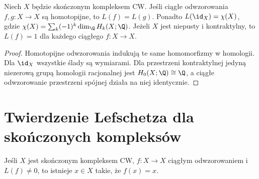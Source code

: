 \begin{wniosek}
Niech $X$ będzie skończonym kompleksem CW.
Jeśli ciągłe odwzorowania $f,g:X\to X$ są homotopijne,
to $L(f)=L(g)$.
Ponadto $L(\id_X)=\chi(X)$, gdzie
$\chi(X)=\sum_k(-1)^k\dim_\Q H_k(X;\Q)$.
Jeżeli $X$ jest niepusty i kontraktylny, to $L(f)=1$
dla każdego ciągłego $f:X\to X$.
\end{wniosek}
\begin{proof}
Homotopijne odwzorowania indukują te same homomorfizmy
w homologii. Dla $\id_X$ wszystkie ślady są wymiarami.
Dla przestrzeni kontraktylnej jedyną niezerową grupą
homologii racjonalnej jest $H_0(X;\Q)\cong\Q$,
a ciągłe odwzorowanie przestrzeni spójnej działa na niej identycznie.
\end{proof}

\section{Twierdzenie Lefschetza dla skończonych kompleksów}
\begin{twierdzenie}
\label{thm:lefschetz-v10}
Jeśli $X$ jest skończonym kompleksem CW, $f:X\to X$
ciągłym odwzorowaniem i $L(f)\ne0$, to istnieje
$x\in X$ takie, że $f(x)=x$.
\end{twierdzenie}
